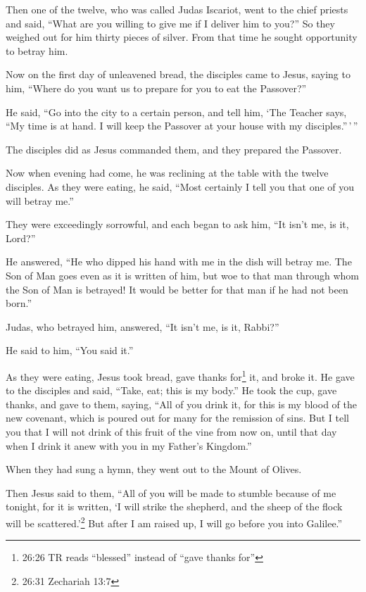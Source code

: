  Then one of the twelve, who was called Judas Iscariot,
went to the chief priests  and said, ``What are you willing
to give me if I deliver him to you?'' So they weighed out for him thirty
pieces of silver.  From that time he sought opportunity to
betray him.

 Now on the first day of unleavened bread, the disciples
came to Jesus, saying to him, ``Where do you want us to prepare for you
to eat the Passover?''

 He said, ``Go into the city to a certain person, and tell
him, `The Teacher says, ``My time is at hand. I will keep the Passover
at your house with my disciples.''\,'\,''

 The disciples did as Jesus commanded them, and they
prepared the Passover.

 Now when evening had come, he was reclining at the table
with the twelve disciples.  As they were eating, he said,
``Most certainly I tell you that one of you will betray me.''

 They were exceedingly sorrowful, and each began to ask
him, ``It isn't me, is it, Lord?''

 He answered, ``He who dipped his hand with me in the dish
will betray me.  The Son of Man goes even as it is written
of him, but woe to that man through whom the Son of Man is betrayed! It
would be better for that man if he had not been born.''

 Judas, who betrayed him, answered, ``It isn't me, is it,
Rabbi?''

He said to him, ``You said it.''

 As they were eating, Jesus took bread, gave thanks
for\footnote{26:26 TR reads ``blessed'' instead of ``gave thanks for''}
it, and broke it. He gave to the disciples and said, ``Take, eat; this
is my body.''  He took the cup, gave thanks, and gave to
them, saying, ``All of you drink it,  for this is my blood
of the new covenant, which is poured out for many for the remission of
sins.  But I tell you that I will not drink of this fruit
of the vine from now on, until that day when I drink it anew with you in
my Father's Kingdom.''

 When they had sung a hymn, they went out to the Mount of
Olives.

 Then Jesus said to them, ``All of you will be made to
stumble because of me tonight, for it is written, `I will strike the
shepherd, and the sheep of the flock will be scattered.'\footnote{26:31
  Zechariah 13:7}  But after I am raised up, I will go
before you into Galilee.''

